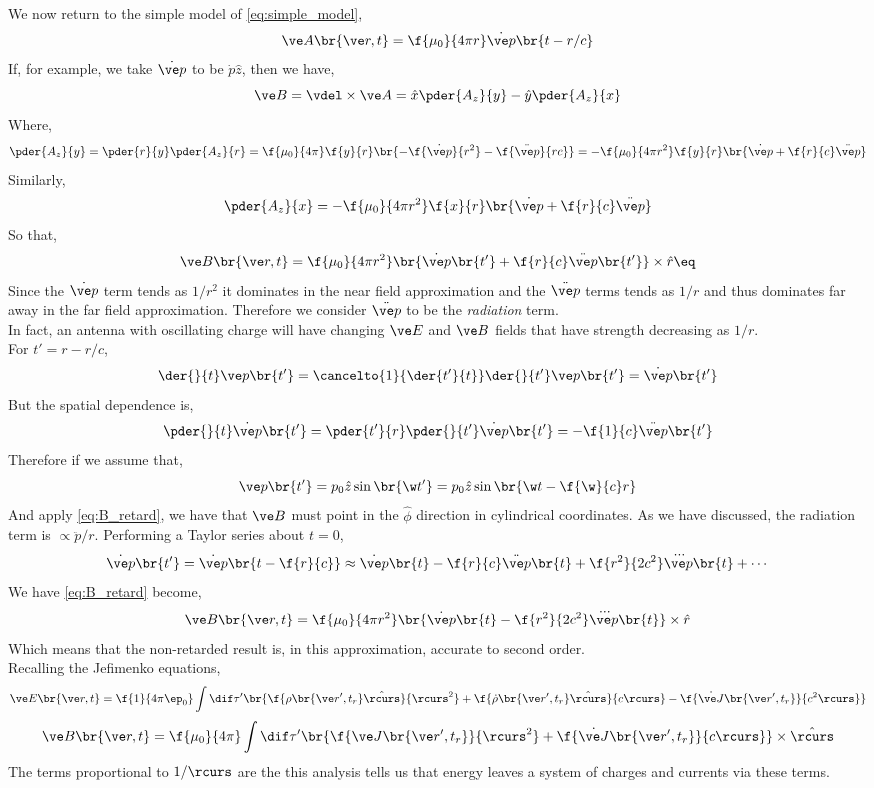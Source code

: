 \documentclass{article}
\begin{document}
We now return to the simple model of \cref{eq:simple_model},
\[ \ve A \br{\ve r, t} = \f{\mu_0}{4 \pi r} \dot {\ve p}\br{t - r/c} \]
If, for example, we take $\dot {\ve p}$ to be $\dot p \hat z$, then we have,
\[ \ve B = \vdel \times \ve A = \hat x \pder{A_z}{y} - \hat y \pder{A_z}{x} \]
Where,
\[ \pder{A_z}{y} = \pder{r}{y}\pder{A_z}{r} = \f{\mu_0}{4 \pi} \f{y}{r} \br{ - \f{\dot {\ve p}}{r^2} - \f{\ddot {\ve p}}{rc}} = - \f{\mu_0}{4 \pi r^2} \f{y}{r} \br{\dot {\ve p} + \f{r}{c}\ddot {\ve p}} \]
Similarly,
\[ \pder{A_z}{x} = - \f{\mu_0}{4 \pi r^2} \f{x}{r} \br{\dot {\ve p} + \f{r}{c}\ddot {\ve p}} \]
So that,
\[ \ve B \br{\ve r, t} = \f{\mu_0}{4 \pi r^2} \br{\dot {\ve p}\br{t'} + \f{r}{c} \ddot {\ve p}\br{t'}} \times \hat r \eq \label{eq:B_retard}\]
Since the $\dot {\ve p}$ term tends as $1/r^2$ it dominates in the near field approximation and the $\ddot {\ve p}$ terms tends as $1 /r$ and thus dominates far away in the far field approximation. Therefore we consider $\ddot {\ve p}$ to be the \textit{radiation} term.\\

In fact, an antenna with oscillating charge will have changing $\ve E$ and $\ve B$ fields that have strength decreasing as $1/r$. \\

For $t' = r - r/c$,
\[ \der{}{t}\ve p \br{t'} = \cancelto{1}{\der{t'}{t}}\der{}{t'}\ve p \br{t'} = \dot {\ve p}\br{t'}  \]
But the spatial dependence is,
\[ \pder{}{t} \dot {\ve p}\br{t'} = \pder{t'}{r} \pder{}{t'} \dot {\ve p}\br{t'} = - \f{1}{c} \ddot {\ve p}\br{t'} \]
Therefore if we assume that,
\[ \ve p \br{t'} = p_0 \hat z \sin \br{\w t'} = p_0 \hat z \sin \br{\w t - \f{\w}{c} r} \]
And apply \cref{eq:B_retard}, we have that $\ve B$ must point in the $\hat \phi$ direction in cylindrical coordinates. As we have discussed, the radiation term is $ \propto \ddot p / r$. Performing a Taylor series about $t = 0$,
\[ \dot {\ve p}\br{t'} = \dot {\ve p}\br{t - \f{r}{c}} \approx \dot {\ve p}\br{t} - \f{r}{c}\ddot {\ve p}\br{t} + \f{r^2}{2 c^2} \dddot {\ve p}\br{t} + \cdots \]
We have \cref{eq:B_retard} become,
\[ \ve B \br{\ve r, t} = \f{\mu_0}{4 \pi r^2} \br{\dot {\ve p}\br{t} - \f{r^2}{2c^2} \dddot {\ve p}\br{t}}\times \hat r \]
Which means that the non-retarded result is, in this approximation, accurate to second order. \\

Recalling the Jefimenko equations,
\[ \ve E \br{\ve r, t} = \f{1}{4 \pi \ep_0} \int \dif \tau' \br{\f{\rho\br{\ve r', t_r} \hat \rcurs}{\rcurs^2} + \f{\dot \rho\br{\ve r', t_r} \hat \rcurs}{c \rcurs} - \f{\dot {\ve J}\br{\ve r', t_r}}{c^2 \rcurs}} \]
\[ \ve B \br{\ve r, t} = \f{\mu_0}{4 \pi} \int \dif \tau' \br{\f{\ve J\br{\ve r', t_r}}{\rcurs^2} + \f{\dot {\ve J}\br{\ve r', t_r}}{c \rcurs}} \times \hat \rcurs \]
The terms proportional to $1/\rcurs$ are the  this analysis tells us that energy leaves a system of charges and currents via these terms.
\end{document}
